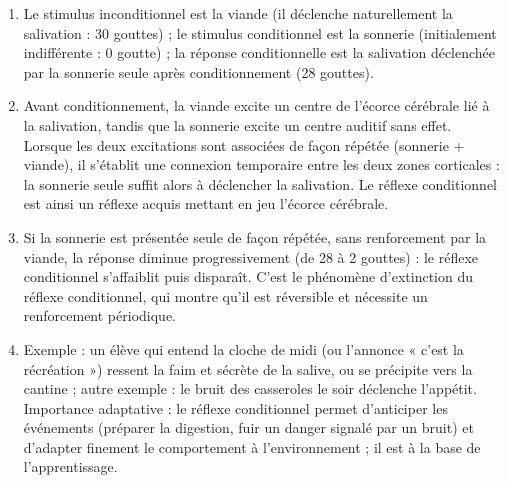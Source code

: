 \documentclass[11pt]{article}
\newcommand{\cle}[1]{{\popxbold\color{popdark}#1}}
\begin{document}
\begin{corrige}
\begin{enumerate}
\item Le \cle{stimulus inconditionnel} est la viande (il déclenche naturellement la salivation : 30 gouttes) ; le \cle{stimulus conditionnel} est la sonnerie (initialement indifférente : 0 goutte) ; la \cle{réponse conditionnelle} est la salivation déclenchée par la sonnerie seule après conditionnement (28 gouttes).
\item Avant conditionnement, la viande excite un centre de l'écorce cérébrale lié à la salivation, tandis que la sonnerie excite un centre auditif sans effet. Lorsque les deux excitations sont \cle{associées de façon répétée} (sonnerie + viande), il s'établit une \cle{connexion temporaire} entre les deux zones corticales : la sonnerie seule suffit alors à déclencher la salivation. Le réflexe conditionnel est ainsi un réflexe \cle{acquis} mettant en jeu l'écorce cérébrale.
\item Si la sonnerie est présentée seule de façon répétée, sans renforcement par la viande, la réponse diminue progressivement (de 28 à 2 gouttes) : le réflexe conditionnel s'affaiblit puis disparaît. C'est le phénomène d'\cle{extinction} du réflexe conditionnel, qui montre qu'il est réversible et nécessite un renforcement périodique.
\item Exemple : un élève qui entend la cloche de midi (ou l'annonce « c'est la récréation ») ressent la faim et sécrète de la salive, ou se précipite vers la cantine ; autre exemple : le bruit des casseroles le soir déclenche l'appétit. Importance adaptative : le réflexe conditionnel permet d'\cle{anticiper} les événements (préparer la digestion, fuir un danger signalé par un bruit) et d'adapter finement le comportement à l'environnement ; il est à la base de l'apprentissage.
\end{enumerate}
\end{corrige}
\end{document}
